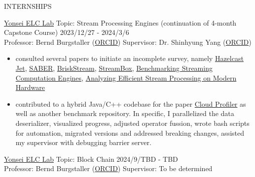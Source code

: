 \documentclass{resume} %
\begin{document}
\begin{rSection}{INTERNSHIPS} 

\href{https://elc.yonsei.ac.kr/}{Yonsei ELC Lab} \quad Topic: Stream Processing Engines
(continuation of 4-month Capstone Course)
 \hfill 2023/12/27 - 2024/3/6 \\ 
Professor: Bernd Burgstaller (\href{https://orcid.org/0000-0002-0374-8853}{ORCID}) 
\qquad Supervisor: Dr. Shinhyung Yang (\href{https://orcid.org/0000-0002-8997-9942}{ORCID})
\begin{itemize}
\item consulted several papers to initiate an incomplete survey, namely 
\href{https://arxiv.org/abs/2103.10169}{Hazelcast Jet},
\href{https://raulcastrofernandez.com/papers/sigmod16-saber.pdf}{SABER},
\href{https://arxiv.org/abs/1904.03604}{BriskStream},
\href{https://www.usenix.org/system/files/conference/atc17/atc17-miao.pdf}{StreamBox},
\href{https://ieeexplore.ieee.org/document/7530084}{Benchmarking Streaming Computation Engines},
\href{https://dl.acm.org/doi/10.14778/3303753.3303758}{Analyzing Efficient Stream Processing on Modern Hardware}
\item contributed to a hybrid Java/C++ codebase for the paper
\href{https://arxiv.org/abs/2205.09325}{Cloud Profiler} as well as another
benchmark repository. In specific, I parallelized the data deserializer,
visualized progress, adjusted operator fussion, wrote bash scripts for
automation, migrated versions and addressed breaking changes, assisted my
supervisor with debugging barrier server.
\end{itemize}

\href{https://elc.yonsei.ac.kr/}{Yonsei ELC Lab} \quad Topic: Block Chain \hfill 2024/9/TBD - TBD \\ 
Professor: Bernd Burgstaller (\href{https://orcid.org/0000-0002-0374-8853}{ORCID}) 
\qquad Supervisor: To be determined


\end{rSection} 

\end{document}
